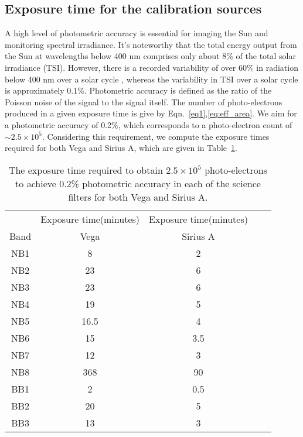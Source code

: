 \subsection{Exposure time for the calibration sources}\label{expo_time}

A high level of photometric accuracy is essential for imaging the Sun and monitoring spectral irradiance. It's noteworthy that the total energy output from the Sun at wavelengths below 400 nm comprises only about 8\% of the total solar irradiance (TSI). However, there is a recorded variability of over 60\% in radiation below 400 nm over a solar cycle \citep{krivova06}, whereas the variability in TSI over a solar cycle is approximately 0.1\%. Photometric accuracy is defined as the ratio of the Poisson noise of the signal to the signal itself. The number of photo-electrons produced in a given exposure time is give by Eqn.~\ref{eq1},\ref{eq:eff_area}. We aim for a photometric accuracy of 0.2\%, which corresponds to a photo-electron count of $\sim 2.5 \times 10^{5}$. Considering this requirement, we compute the exposure times required for both Vega and Sirius A, which are given in Table~\ref{tab_2}.

\begin{table}
\centering
\begin{tabular}{ccccc}
\hline
        & Exposure time(minutes) & Exposure time(minutes) \\
        Band & Vega & Sirius A\\
        \hline
        NB1 & 8 & 2\\
        NB2 & 23 & 6\\
        NB3 & 23 & 6\\
        NB4 & 19 & 5\\
        NB5 & 16.5 & 4\\
        NB6 & 15 & 3.5\\
        NB7 & 12 & 3\\
        NB8 & 368 & 90\\
        BB1 & 2 & 0.5\\
        BB2 & 20 & 5\\
        BB3 & 13 & 3\\
        \hline
    \end{tabular}
    \caption{The exposure time required to obtain $2.5 \times 10^{5}$ photo-electrons to achieve 0.2\% photometric accuracy in each of the science filters for both Vega and Sirius A.}
\label{tab_2}
\end{table}

